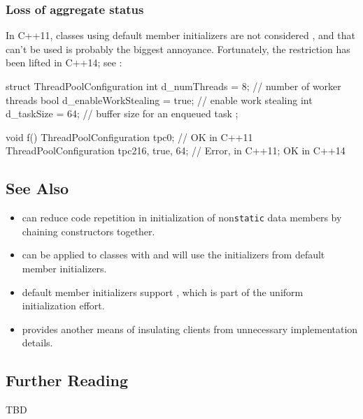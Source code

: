 \subsubsection[Loss of aggregate status]{Loss of aggregate status}\label{loss-of-aggregate-status}

In C++11, classes using default member initializers are not considered
, and that  can't be
used is probably the biggest annoyance. Fortunately, the restriction has
been lifted in C++14; see :

\begin{emcppslisting}
struct ThreadPoolConfiguration
{
    int  d_numThreads         = 8;     // number of worker threads
    bool d_enableWorkStealing = true;  // enable work stealing
    int  d_taskSize           = 64;    // buffer size for an enqueued task
};

void f()
{
    ThreadPoolConfiguration tpc0;               // OK in C++11
    ThreadPoolConfiguration tpc2{16, true, 64}; // Error, in C++11; OK in C++14
}
\end{emcppslisting}
    

\subsection[See Also]{See Also}\label{see-also}

\begin{itemize}
\item{can reduce code repetition in initialization of non\lstinline!static! data members by chaining constructors together.}
\item{can be applied to classes with and will use the initializers from default member initializers.}
\item{default member initializers support , which is part of the uniform initialization effort.}
\item{provides another means of insulating clients from unnecessary implementation details.}
\end{itemize}

\subsection[Further Reading]{Further Reading}

TBD
